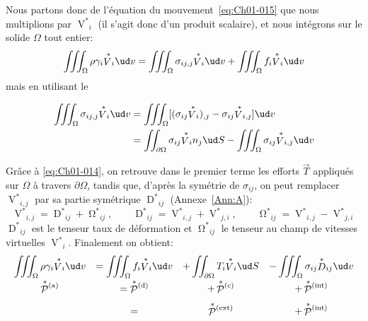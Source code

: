 Nous partons donc de l'équation du mouvement~\eqref{eq:Ch01-015} que nous multiplions par $\displaystyle{\mathop{V}^{*}}_i$ (il s'agit donc d'un produit scalaire), et nous intégrons sur le solide $\Omega$ tout entier:
\begin{equation*}
    \iiint_{\Omega}\rho\gamma_i {\mathop{V}^{*}}_i \ud v=\iiint_{\Omega}\sigma_{ij,j} {\mathop{V}^{*}}_i \ud v+\iiint_{\Omega}f_i {\mathop{V}^{*}}_i \ud v
\end{equation*}
mais en utilisant le
\begin{thm}
\begin{align*}
    \iiint_{\Omega}\sigma_{ij,j} {\mathop{V}^{*}}_i \ud v &= \iiint_{\Omega}[(\sigma_{ij} {\mathop{V}^{*}}_i)_{,j}-\sigma_{ij} {\mathop{V}^{*}}_{i,j}]\ud v\\
    &=\iint_{\partial \Omega}\sigma_{ij} {\mathop{V}^{*}}_i n_j \ud S-\iiint_{\Omega} \sigma_{ij} {\mathop{V}^{*}}_{i,j} \ud v
\end{align*}
\end{thm}
Grâce à \eqref{eq:Ch01-014}, on retrouve dans le premier terme les efforts $\vec{T}$ appliqués sur $\Omega$ à travers $\partial \Omega$, tandis que, d'après la symétrie de $\sigma_{ij}$, on peut remplacer $\displaystyle{\mathop{V}^{*}}_{i,j}$ par sa partie symétrique $\displaystyle{\mathop{D}^{*}}_{ij}$ (Annexe~\ref{Ann:A}):
\begin{equation}
    {\mathop{V}^{{\ast}}}_{i,j}={\mathop{D}^{{\ast}}}_{ij}+{\mathop{\Omega}^{{\ast}}}_{ij},\qquad
    {\mathop{D}^{{\ast}}}_{ij}={\mathop{V}^{{\ast}}}_{i,j}+{\mathop{V}^{{\ast}}}_{j,i},\qquad
    {\mathop{\Omega}^{{\ast}}}_{ij}={\mathop{V}^{{\ast}}}_{i,j}-{\mathop{V}^{{\ast}}}_{j,i}
    \label{eq:Ch01-023}
\end{equation}
$\displaystyle{\mathop{D}^{{\ast}}}_{ij}$ est le tenseur taux de déformation et $\displaystyle{\mathop{\Omega}^{{\ast}}}_{ij}$ le tenseur au champ de vitesses virtuelles $\displaystyle{\mathop{V}^{{\ast}}}_i$.
Finalement on obtient:
\begin{equation}
    \everymath{\displaystyle}
    \begin{array}{cccc}
        \iiint_{\Omega}\rho\gamma_i {\mathop{V}^{\ast}}_i \ud v & = \iiint_{\Omega}f_i {\mathop{V}^{\ast}}_i \ud v & +                                                    \iint_{\partial\Omega}T_i {\mathop{V}^{\ast}}_i \ud S & -                           \iiint_{\Omega}\sigma_{ij} {\mathop{D}^{\ast}}_{ij} \ud v\\[7pt]
        \mathop{\mathcal{P}}^{\ast}{\!}^{(\text{a})} & = \mathop{\mathcal{P}}^{\ast}{\!}^{(\text{d})} & + \mathop{\mathcal{P}}^{\ast}{\!}^{(\text{c})} & + \mathop{\mathcal{P}}^{\ast}{\!}^{(\text{int})}\\[7pt]
        & =  & \mathop{\mathcal{P}}^{\ast}{\!}^{(\text{ext})} & + \mathop{\mathcal{P}}^{\ast}{\!}^{(\text{int})}
    \end{array}
    \label{eq:Ch01-024}
\end{equation}
